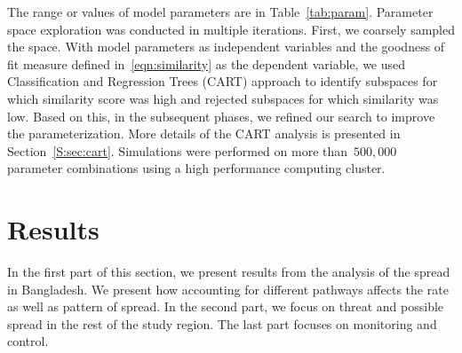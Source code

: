 \documentclass[11pt]{article}
\newcommand{\tuta}{\emph{T.~absoluta}}
\theoremstyle{definition}
\begin{document}
The range or values of model parameters are in Table~\ref{tab:param}.
Parameter space exploration was conducted in multiple iterations.  First,
we coarsely sampled the space. With model parameters as independent
variables and the goodness of fit measure defined in~\eqref{eqn:similarity}
as the dependent variable, we used Classification and Regression Trees
(CART) approach to identify subspaces for which similarity score was high
and rejected subspaces for which similarity was low. Based on this, in the
subsequent phases, we refined our search to improve the parameterization.
More details of the CART analysis is presented in Section~\ref{S:sec:cart}.
Simulations were performed on more than~$500,000$ parameter combinations
using a high performance computing cluster.


\section{Results}
In the first part of this section, we present results from the analysis of
the spread in Bangladesh. We present how accounting for different pathways
affects the rate as well as pattern of spread. In the second part, we
focus on threat and possible spread in the rest of the study region. The
last part focuses on monitoring and control.
\end{document}
